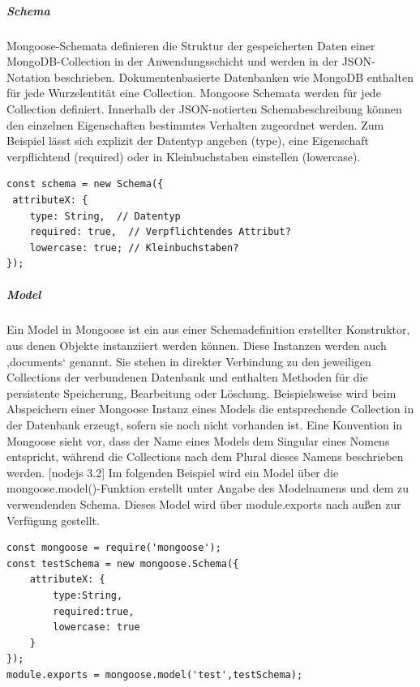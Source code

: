 \subparagraph{Schema}
Mongoose-Schemata definieren die Struktur der gespeicherten Daten einer MongoDB-Collection in der Anwendungsschicht und werden in der JSON-Notation beschrieben. Dokumentenbasierte Datenbanken wie MongoDB enthalten für jede Wurzelentität eine Collection. Mongoose Schemata werden für jede Collection definiert. Innerhalb der JSON-notierten Schemabeschreibung können den einzelnen Eigenschaften bestimmtes Verhalten zugeordnet werden. Zum Beispiel lässt sich explizit der Datentyp angeben (type), eine Eigenschaft verpflichtend (required) oder in Kleinbuchstaben einstellen (lowercase).
\newline


\begin{lstlisting}[caption=Mongoose Schema - Beispiel,label=lst:MongooseSchema]
const schema = new Schema({
 attributeX: {
 	type: String,  // Datentyp
 	required: true,  // Verpflichtendes Attribut?
 	lowercase: true; // Kleinbuchstaben?
});
\end{lstlisting}

\newpage
\subparagraph{Model}
Ein Model in Mongoose ist ein aus einer Schemadefinition erstellter Konstruktor, aus denen Objekte instanziiert werden können. Diese Instanzen werden auch ‚documents‘ genannt. Sie stehen in direkter Verbindung zu den jeweiligen Collections der verbundenen Datenbank und enthalten Methoden für die persistente Speicherung, Bearbeitung oder Löschung. Beispielsweise wird beim Abspeichern einer Mongoose Instanz eines Models die entsprechende Collection in der Datenbank erzeugt, sofern sie noch nicht vorhanden ist. Eine Konvention in Mongoose sieht vor, dass der Name eines Models dem Singular eines Nomens entspricht, während die Collections nach dem Plural dieses Namens beschrieben werden. [nodejs 3.2] Im folgenden Beispiel wird ein Model über die mongoose.model()-Funktion erstellt unter Angabe des Modelnamens und dem zu verwendenden Schema. Dieses Model wird über module.exports nach außen zur Verfügung gestellt.

\begin{lstlisting}[caption=Model erstellen und exportierenn,label=lst:MongooseObjectExport]
const mongoose = require('mongoose');
const testSchema = new mongoose.Schema({
	attributeX: {
		type:String,
		required:true,
		lowercase: true
	}
});
module.exports = mongoose.model('test',testSchema);
\end{lstlisting}

